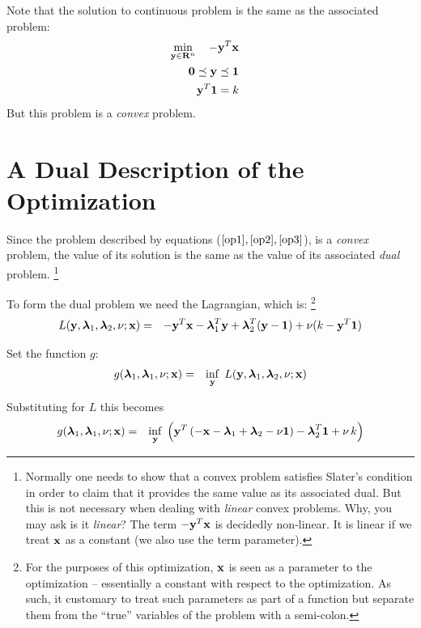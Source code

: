 \documentclass[12pt]{article}
\begin{document}
Note that the solution to continuous problem is the same as the associated problem:
\begin{eqnarray}
	\mathop{\rm min}_{{\bf y} \in {\bf R}^n}\limits \quad -{\bf y}^T {\bf x} && \label{op1} \\ 
	{\bf 0} \preceq {\bf y} \preceq {\bf 1} &&  \label{op2}\\
	{\bf y}^T {\bf 1} =  k \label{op3} &&
\end{eqnarray}
But this problem is a {\it convex\/} problem.

\section{A Dual Description of the Optimization}
Since the problem described by equations ($\ref{op1}, \ref{op2}, \ref{op3}$), is
a {\it convex\/} problem, the value of its solution is the same as the value of 
its associated {\it dual\/} problem.%
\footnote{Normally one needs to show that a convex problem satisfies Slater's condition
	in order to claim that it provides the same value as its associated dual.
But this is not necessary when dealing with {\it linear\/} convex problems. 
Why, you may ask is it {\it linear\/}? The term $-{\bf y}^T {\bf x}$ is
decidedly non-linear. It is linear if we treat ${\bf x}$ as a constant (we also
use the term parameter).}

To form the dual problem we need the Lagrangian, which is:%
\footnote{For the purposes of this optimization, ${\bf x}$ is seen as a parameter
to the optimization -- essentially a constant with respect to the optimization.
As such, it customary to treat such parameters as part of a function but separate
them from the ``true'' variables of the problem with a semi-colon.}
\begin{eqnarray}
	L({\bf y}, {\boldsymbol \lambda}_1, {\boldsymbol \lambda}_2, \nu; {\bf x}) &=& -{\bf y}^T {\bf x} - {\boldsymbol \lambda}_1^T {\bf y} + {\boldsymbol \lambda}_2^T ({\bf y} - {\bf 1}) + \nu (k - {\bf y}^T {\bf 1}) 
\end{eqnarray}

Set the function $g$:
\begin{eqnarray}
	g({\boldsymbol \lambda}_1, {\boldsymbol \lambda}_1, \nu; {\bf x}) &=& \mathop{\rm inf}_{\bf y} \; L({\bf y}, {\boldsymbol \lambda}_1, {\boldsymbol \lambda}_2, \nu; {\bf x}) 
\end{eqnarray}

Substituting for $L$ this becomes
\begin{eqnarray}
	g({\boldsymbol \lambda}_1, {\boldsymbol \lambda}_1, \nu; {\bf x}) &=& \mathop{\rm inf}_{\bf y} \; \left({\bf y}^T \left( -{\bf x} - {\boldsymbol \lambda}_1 + {\boldsymbol \lambda}_2 - \nu {\bf 1} \right) - {\boldsymbol \lambda}_2^T {\bf 1} + \nu \, k  \right)
\end{eqnarray}
\end{document}
